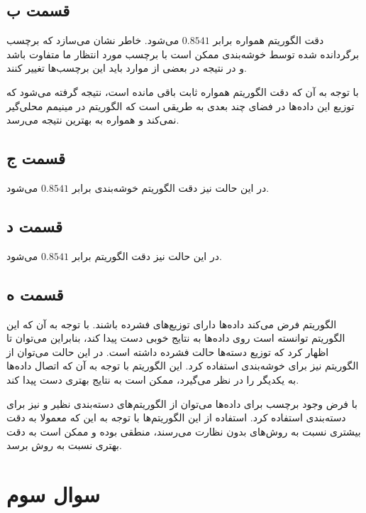 \documentclass[12pt, a4paper]{article}
\begin{document}
\subsection*{قسمت ب}

دقت الگوریتم همواره برابر $0.8541$ می‌شود. خاطر نشان می‌سازد که برچسب برگردانده
شده توسط خوشه‌بندی  ممکن است با برچسب مورد انتظار ما متفاوت باشد
و در نتیجه در بعضی از موارد باید این برچسب‌ها تغییر کنند.

با توجه به آن که دقت الگوریتم همواره ثابت باقی مانده است، نتیجه گرفته می‌شود
که توزیع این داده‌ها در فضای چند بعدی به طریقی است که الگوریتم 
در مینیمم محلی‌گیر نمی‌کند و همواره به بهترین نتیجه می‌رسد.

\subsection*{قسمت ج}

در این حالت نیز دقت الگوریتم خوشه‌بندی برابر $0.8541$ می‌شود.

\subsection*{قسمت د}

در این حالت نیز دقت الگوریتم برابر $0.8541$ می‌شود.

\subsection*{قسمت ه}

الگوریتم  فرض می‌کند داده‌ها دارای توزیع‌های فشرده باشند. با توجه به آن
که این الگوریتم توانسته است روی داده‌ها به نتایج خوبی دست پیدا کند، بنابراین
می‌توان تا اظهار کرد که توزیع دسته‌ها حالت فشرده داشته است. در این حالت
می‌توان از الگوریتم  نیز برای خوشه‌بندی استفاده کرد.
این الگوریتم با توجه به آن که اتصال داده‌ها به یکدیگر را در نظر می‌گیرد،
ممکن است به نتایج بهتری دست پیدا کند.

با فرض وجود برچسب برای داده‌ها می‌توان از الگوریتم‌های دسته‌بندی نظیر
 و  نیز برای دسته‌بندی استفاده کرد. استفاده از این الگوریتم‌ها
با توجه به این که معمولا به دقت بیشتری نسبت به روش‌های بدون نظارت
می‌رسند، منطقی بوده و ممکن است به دقت بهتری نسبت به روش  برسد.

\clearpage
\thispagestyle{fancy}

\section*{سوال سوم}
\end{document}

